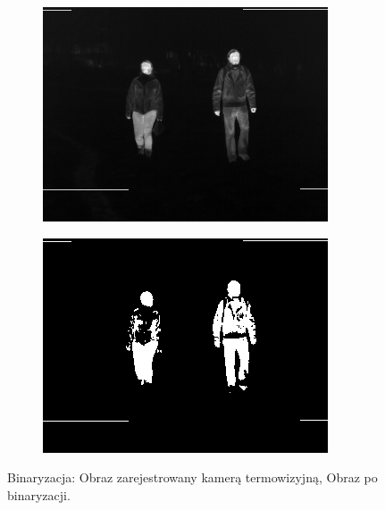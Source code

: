 \begin{figure}[h]
	\centering
	\begin{subfigure}{0.47\textwidth}
		\centering
		\includegraphics[width=0.9\linewidth]{images/Example_Oryginal}
		\subcaption{\label{fig:Example_Oryginal}}
	\end{subfigure}
	\begin{subfigure}{0.47\textwidth}
		\centering
		\includegraphics[width=0.9\linewidth]{images/Example_BW}
		\subcaption{\label{fig:Example_BW}}
	\end{subfigure}
	\caption[Przykład binaryzacji]{Binaryzacja: \protect{} Obraz zarejestrowany kamerą termowizyjną, \protect{} Obraz po binaryzacji\cite{kankaing}.}
	\label{fig:binaryzacja}
\end{figure}


